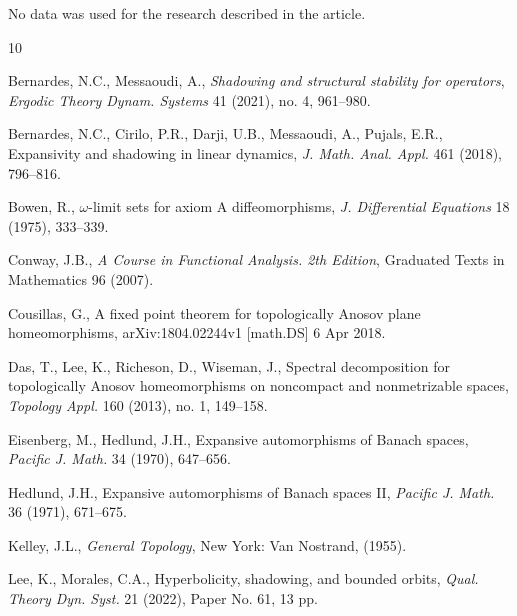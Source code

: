 \documentclass[11pt,letterpaper]{amsart}
\numberwithin{equation}{section}
\begin{document}
\noindent
No data was used for the research described in the article.


















\begin{thebibliography}{10}


Bernardes, N.C., Messaoudi, A.,
{\em Shadowing and structural stability for operators},
{\em Ergodic Theory Dynam. Systems} 41 (2021), no. 4, 961--980.


Bernardes, N.C., Cirilo, P.R., Darji, U.B., Messaoudi, A., Pujals, E.R.,
Expansivity and shadowing in linear dynamics,
{\em J. Math. Anal. Appl.} 461 (2018), 796--816.


Bowen, R.,
$\omega$-limit sets for axiom A diffeomorphisms,
{\em J. Differential Equations} 18 (1975), 333--339.

Conway, J.B.,
{\em A Course in Functional Analysis. 2th Edition},
Graduated Texts in Mathematics 96 (2007).



Cousillas, G.,
A fixed point theorem for topologically Anosov plane homeomorphisms,
arXiv:1804.02244v1 [math.DS] 6 Apr 2018.






Das, T., Lee, K., Richeson, D., Wiseman, J.,
Spectral decomposition for topologically Anosov homeomorphisms on noncompact and nonmetrizable spaces,
{\em Topology Appl.} 160 (2013), no. 1, 149--158.




Eisenberg, M., Hedlund, J.H.,
Expansive automorphisms of Banach spaces,
{\em Pacific J. Math.} 34 (1970), 647--656.

Hedlund, J.H.,
Expansive automorphisms of Banach spaces II,
{\em Pacific J. Math.} 36 (1971), 671--675.









Kelley, J.L.,
{\em General Topology},
New York: Van Nostrand, (1955).




Lee, K., Morales, C.A.,
Hyperbolicity, shadowing, and bounded orbits,
{\em Qual. Theory Dyn. Syst.} 21 (2022), Paper No. 61, 13 pp.




\end{thebibliography}
\end{document}
